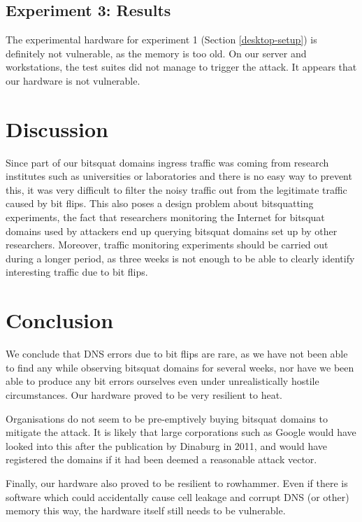 \documentclass[conference]{IEEEtran}
\begin{document}
\subsection{Experiment 3: Results}

The experimental hardware for experiment 1 (Section \ref{desktop-setup}) is
definitely not vulnerable, as the memory is too old. On our server and
workstations, the test suites did not manage to trigger the attack. It appears
that our hardware is not vulnerable.



\section{Discussion}\label{sec:disc}

Since part of our bitsquat domains ingress traffic was coming from
research institutes such as universities or laboratories and there is no easy
way to prevent this, it was very difficult to filter the noisy traffic out from
the legitimate traffic caused by bit flips. This also poses a design problem
about bitsquatting experiments, the fact that researchers monitoring the
Internet for bitsquat domains used by attackers end up querying
bitsquat domains set up by other researchers. Moreover, traffic monitoring
experiments should be carried out during a longer period, as three weeks is not
enough to be able to clearly identify interesting traffic due to bit flips.


\section{Conclusion}\label{sec:conc}

We conclude that DNS errors due to bit flips are rare, as we have not been able
to find any while observing bitsquat domains for several weeks, nor have we
been able to produce any bit errors ourselves even under unrealistically
hostile circumstances. Our hardware proved to be very resilient to heat.

Organisations do not seem to be pre-emptively buying bitsquat domains to
mitigate the attack. It is likely that large corporations such as Google would
have looked into this after the publication by Dinaburg in 2011, and would have
registered the domains if it had been deemed a reasonable attack vector.

Finally, our hardware also proved to be resilient to rowhammer. Even if there is
software which could accidentally cause cell leakage and corrupt DNS (or other)
memory this way, the hardware itself still needs to be vulnerable.
\end{document}
